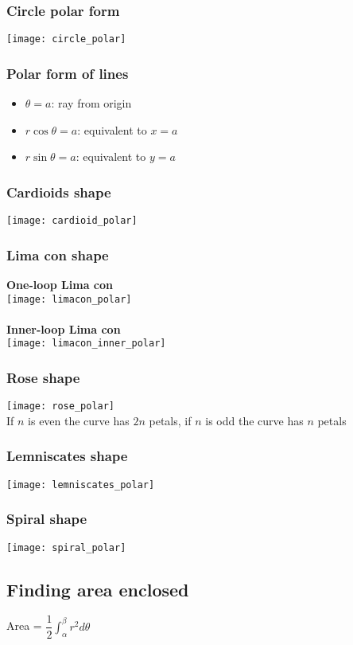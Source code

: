 \subsubsection{Circle polar form}
\texttt{[image: circle\_polar]}

\subsubsection{Polar form of lines}
\begin{itemize}
	\item $\theta=a$: ray from origin
	\item $r\cos\theta=a$: equivalent to $x=a$
	\item $r\sin\theta=a$: equivalent to $y=a$
\end{itemize}

\subsubsection{Cardioids shape}
\texttt{[image: cardioid\_polar]}
\subsubsection{Lima con shape}
\textbf{One-loop Lima con}\\
\texttt{[image: limacon\_polar]}\\ \\
\textbf{Inner-loop Lima con}\\
\texttt{[image: limacon\_inner\_polar]}
\subsubsection{Rose shape}
\texttt{[image: rose\_polar]}\\
If $n$ is even the curve has $2n$ petals, if $n$ is odd the curve has $n$ petals

\subsubsection{Lemniscates shape}
\texttt{[image: lemniscates\_polar]}

\subsubsection{Spiral shape}
\texttt{[image: spiral\_polar]}




\subsection{Finding area enclosed}
Area = $\dfrac{1}{2}\int_{\alpha}^{\beta} r^2d\theta$